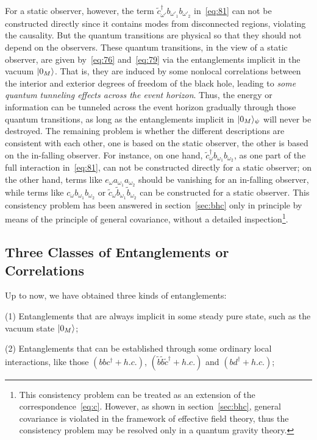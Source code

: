 \documentclass[12pt,a4paper]{article}
\begin{document}
For a static observer, however, the term $\tilde{c}_{\omega'}^{\dag}b_{\omega'_1}b_{\omega'_2}$ in~\eqref{eq:81} can not be constructed directly since it contains modes from
disconnected regions, violating the causality. But the quantum
transitions are physical so that they should not depend on the observers. These quantum transitions, in the view of a static observer, are given by~\eqref{eq:76} and~\eqref{eq:79} via the entanglements implicit in the vacuum $\arrowvert0_M\rangle$. That is, they are induced by some nonlocal correlations between the interior and exterior degrees of freedom of the black hole, leading to \emph{some quantum tunneling effects across the event horizon}. Thus, the energy or information can be tunneled across the event horizon gradually through those quantum transitions, as long as the entanglements implicit in $\arrowvert0_M\rangle_{\psi}$ will never be destroyed.
The remaining problem is whether the different descriptions
are consistent with each other, one is based on the static observer, the other is based on the in-falling observer. For instance, on one hand,
$\tilde{c}_{\omega}^{\dag}b_{\omega_1}b_{\omega_2}$, as one part of the
full interaction in~\eqref{eq:81}, can not be constructed directly for a static observer; on the other hand, terms like
$e_{\omega}a_{\omega_1}a_{\omega_2}$ should be vanishing for an
in-falling observer, while terms like
$c_{\omega}b_{\omega_1}b_{\omega_2}$ or
$\tilde{c}_{\omega}\tilde{b}_{\omega_1}\tilde{b}_{\omega_2}$ can be
constructed for a static observer. This consistency problem has been answered in section~\ref{sec:bhc} only in principle by means of the principle of general covariance, without a detailed inspection\footnote{This consistency problem can be treated as an extension of the correspondence~\eqref{eq:c}. However, as shown in section~\ref{sec:bhc}, general covariance is violated in the framework of effective field theory, thus the consistency problem may be resolved only in a quantum gravity theory.}.

\subsection{Three Classes of Entanglements or Correlations}
\label{sec:entan}

Up to now, we have obtained three kinds of entanglements:

(1) Entanglements that are always implicit in some steady pure state, such as the
vacuum state $\arrowvert0_{M}\rangle$;

(2) Entanglements that can be established through some ordinary local
interactions, like those $(bbc^{\dag}+h.c.)$,
$(\tilde{b}\tilde{b}\tilde{c}^{\dag}+h.c.)$ and $(bd^{\dag}+h.c.)$;
\end{document}

